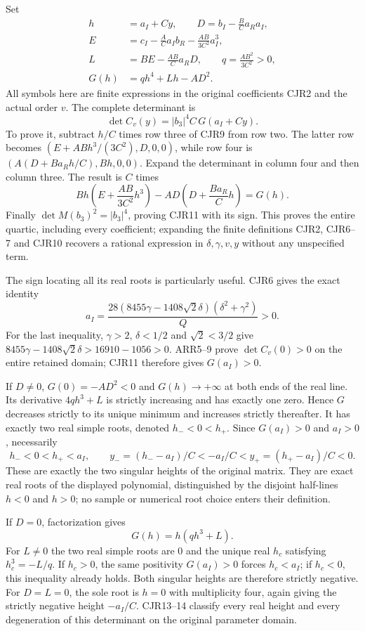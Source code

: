 \documentclass[11pt]{article}
\begin{document}
Set
\[
\begin{split}
 h&=a_I+Cy,\qquad D=b_I-\frac{B}{C}a_Ra_I,\\
 E&=c_I-\frac{A}{C}a_Ib_R-\frac{AB}{3C^2}a_I^3,\\
 L&=BE-\frac{AB}{C}a_RD,\qquad
 q=\frac{AB^2}{3C^2}>0,\\
 G(h)&=qh^4+Lh-AD^2.
\end{split}\tag{CJR10}
\]
All symbols here are finite expressions in the original coefficients
CJR2 and the actual order $v$. The complete determinant is
\[
 \boxed{\det C_v(y)=|b_3|^4 C\,
          G(a_I+Cy).}
 \tag{CJR11}
\]
To prove it, subtract $h/C$ times row three of CJR9 from row two.
The latter row becomes
$(E+ABh^3/(3C^2),D,0,0)$, while row four is
$(A(D+Ba_Rh/C),Bh,0,0)$.
Expand the determinant in column four and then column three.
The result is $C$ times
\[
 Bh\left(E+\frac{AB}{3C^2}h^3\right)
     -AD\left(D+\frac{Ba_R}{C}h\right)=G(h).
\]
Finally $\det M(b_3)^2=|b_3|^4$, proving CJR11 with its sign.
This proves the entire quartic, including every coefficient; expanding
the finite definitions CJR2, CJR6--7 and CJR10 recovers a rational
expression in $\delta,\gamma,v,y$ without any unspecified term.

The sign locating all its real roots is particularly useful. CJR6
gives the exact identity
\[
 a_I=\frac{28(8455\gamma-1408\sqrt2\delta)
                   (\delta^2+\gamma^2)}{Q}>0.
 \tag{CJR12}
\]
For the last inequality, $\gamma>2$, $\delta<1/2$ and
$\sqrt2<3/2$ give
$8455\gamma-1408\sqrt2\delta>16910-1056>0$.
ARR5--9 prove $\det C_v(0)>0$ on the entire retained domain;
CJR11 therefore gives $G(a_I)>0$.

If $D\ne0$, $G(0)=-AD^2<0$ and $G(h)\to+\infty$ at both
ends of the real line. Its derivative $4qh^3+L$ is strictly
increasing and has exactly one zero. Hence $G$ decreases strictly
to its unique minimum and increases strictly thereafter. It has
exactly two real simple roots, denoted $h_-<0<h_+$. Since
$G(a_I)>0$ and $a_I>0$, necessarily
\[
 h_-<0<h_+<a_I,\qquad
 y_-=(h_--a_I)/C<-a_I/C<y_+=(h_+-a_I)/C<0.
 \tag{CJR13}
\]
These are exactly the two singular heights of the original matrix.
They are exact real roots of the displayed polynomial, distinguished
by the disjoint half-lines $h<0$ and $h>0$; no sample
or numerical root choice enters their definition.

If $D=0$, factorization gives
\[
 G(h)=h(qh^3+L).
 \tag{CJR14}
\]
For $L\ne0$ the two real simple roots are $0$ and the unique real
$h_c$ satisfying $h_c^3=-L/q$. If $h_c>0$, the same positivity
$G(a_I)>0$ forces $h_c<a_I$; if $h_c<0$, this inequality already
holds. Both singular heights are therefore strictly negative.
For $D=L=0$, the sole root is $h=0$ with multiplicity four,
again giving the strictly negative height $-a_I/C$.
CJR13--14 classify every real height and every degeneration of this
determinant on the original parameter domain.
\end{document}
